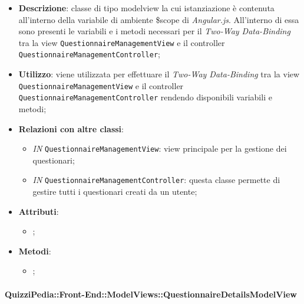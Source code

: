 	\begin{itemize}
		\item \textbf{Descrizione}: classe di tipo modelview la cui istanziazione è contenuta all'interno della variabile di ambiente \$scope di \textit{Angular.js}. All'interno di essa sono presenti le variabili e i metodi necessari per il \textit{Two-Way Data-Binding} tra la view \texttt{QuestionnaireManagementView} e il controller \texttt{QuestionnaireManagementController};
		\item \textbf{Utilizzo}: viene utilizzata per effettuare il \textit{Two-Way Data-Binding} tra la view \texttt{QuestionnaireManagementView} e il controller \texttt{QuestionnaireManagementController} rendendo disponibili variabili e metodi;
		\item \textbf{Relazioni con altre classi}: 
		\begin{itemize}
			\item \textit{IN} \texttt{QuestionnaireManagementView}: view principale per la gestione dei questionari; 
			\item \textit{IN} \texttt{QuestionnaireManagementController}: questa classe permette di gestire tutti i questionari creati da un utente;
		\end{itemize}
		\item \textbf{Attributi}: 
		\begin{itemize}
			\item ;
		\end{itemize}
		\item \textbf{Metodi}: 
		\begin{itemize}
			\item ;
		\end{itemize}
	\end{itemize}
	
	\paragraph{QuizziPedia::Front-End::ModelViews::QuestionnaireDetailsModelView}
	
	\label{QuizziPedia::Front-End::ModelViews::QuestionnaireDetailsModelView}
	
